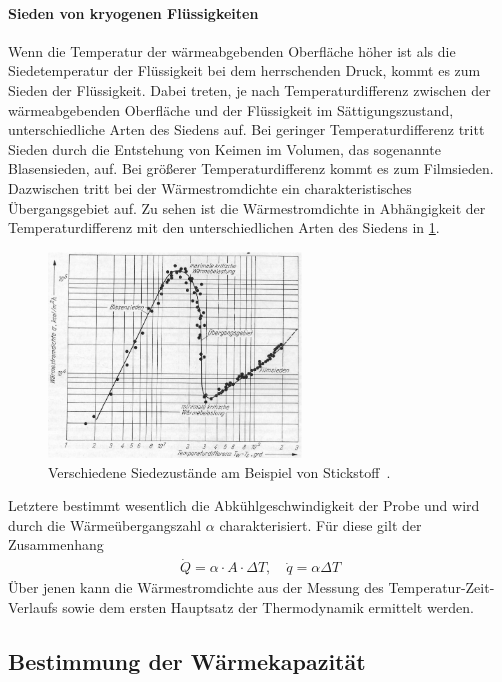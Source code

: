 \documentclass[parskip=half, a4paper,twoside,final]{article}
\begin{document}
\paragraph{Sieden von kryogenen Flüssigkeiten}\label{sec:Sieden}
Wenn die Temperatur der wärmeabgebenden Oberfläche höher ist als die Siedetemperatur der Flüssigkeit bei dem herrschenden Druck, kommt es zum Sieden der Flüssigkeit. Dabei treten, je nach Temperaturdifferenz zwischen der wärmeabgebenden Oberfläche und der Flüssigkeit im Sättigungszustand, unterschiedliche Arten des Siedens auf. Bei geringer Temperaturdifferenz tritt Sieden durch die Entstehung von Keimen im Volumen, das sogenannte Blasensieden, auf. Bei größerer Temperaturdifferenz kommt es zum Filmsieden. Dazwischen tritt bei der Wärmestromdichte ein charakteristisches Übergangsgebiet auf. Zu sehen ist die Wärmestromdichte in Abhängigkeit der Temperaturdifferenz mit den unterschiedlichen Arten des Siedens in \ref{fig:Wärmestromdichte}.
\begin{figure}[htp]
    \centering
        \includegraphics[width=0.6\textwidth]{Bilder/Filmsieden_Blasensieden.pdf}
    \caption{Verschiedene Siedezustände am Beispiel von Stickstoff~\cite{Fastowski}.}
    \label{fig:Wärmestromdichte}
\end{figure}

Letztere bestimmt wesentlich die Abkühlgeschwindigkeit der Probe und wird durch die Wärmeübergangszahl $\alpha$ charakterisiert. Für diese gilt der Zusammenhang
\begin{align}\label{eqn:Waermeuebergangszahl}
  \dot{Q}=\alpha\cdot A \cdot \Delta T, \quad \dot{q}=\alpha\Delta T
\end{align}
Über jenen kann die Wärmestromdichte aus der Messung des Temperatur-Zeit-Verlaufs sowie dem ersten Hauptsatz der Thermodynamik ermittelt werden.

\subsection{Bestimmung der Wärmekapazität}
\end{document}

